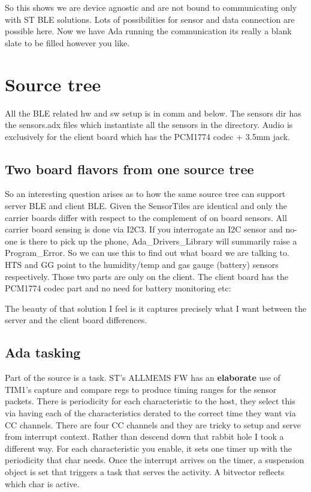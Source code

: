 \documentclass[11pt]{article}
\numberwithin{figure}{section}
\begin{document}
So this shows we are device agnostic and are not bound to
communicating only with ST BLE solutions. Lots of possibilities for
sensor and data connection are possible here. Now we have Ada running
the communication its really a blank slate to be filled however you
like.

\section{Source tree}


All the BLE related hw and sw setup is in comm and below. The sensors dir has
the sensors.adx files which instantiate all the sensors in the
directory. Audio is exclusively for the client board which has the
PCM1774 codec + 3.5mm jack.
\subsection{Two board flavors from one source tree}
So an interesting question arises as to how the same source tree can
support server BLE and client BLE. Given the SensorTiles are identical
and only the carrier boards differ with respect to the complement of
on board sensors. All carrier board sensing is done via I2C3. If you
interrogate an I2C sensor and no-one is there to pick up the phone,
Ada\_Drivers\_Library will summarily raise a Program\_Error. So we can
use this to find out what board we are talking to. HTS and GG point to
the humidity/temp and gas gauge (battery) sensors respectively. Those two
parts are only on the client. The client board has the PCM1774 codec
part and no need for battery monitoring etc:

{
\selectfont

}

The beauty of that solution I feel is it captures precisely what I
want between the server and the client board differences.

\subsection{Ada tasking}
Part of the source is a task. ST's ALLMEMS FW has an
\textbf{elaborate} use of TIM1's capture and compare regs to produce
timing ranges for the sensor packets. There is periodicity for each
characteristic to the host, they select this via having each of the
characteristics derated to the correct time they want via CC
channels. There are four CC channels and they are tricky to setup and
serve from interrupt context. Rather than descend down that rabbit
hole I took a different way. For each characteristic you enable, it
sets one timer up with the periodicity that char needs. Once the
interrupt arrives on the timer, a suspension object is set that
triggers a task that serves the activity. A bitvector reflects which
char is active.
\end{document}
